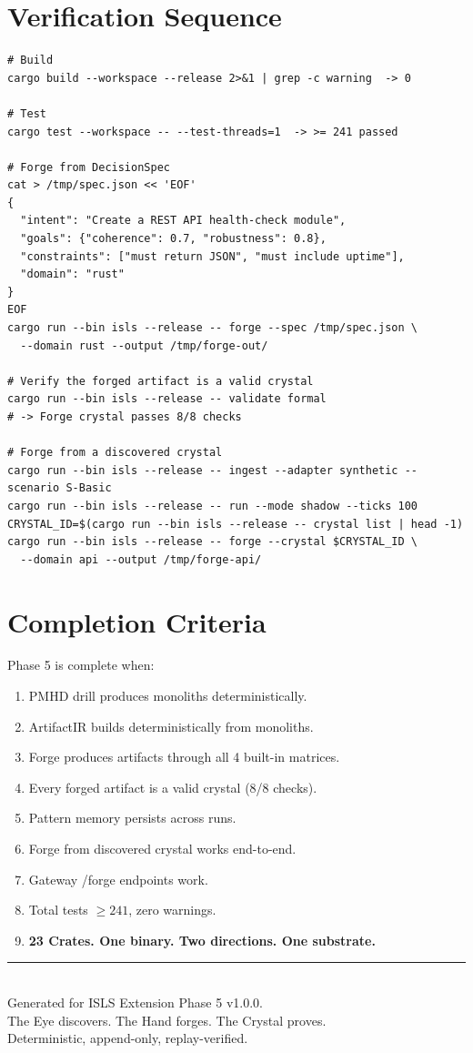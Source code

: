 \documentclass[11pt,a4paper,twoside]{article}
\theoremstyle{definition}
\theoremstyle{plain}
\theoremstyle{remark}
\newcommand{\ISLS}{\textsf{ISLS}}
\begin{document}
\section{Verification Sequence}

\begin{lstlisting}
# Build
cargo build --workspace --release 2>&1 | grep -c warning  -> 0

# Test
cargo test --workspace -- --test-threads=1  -> >= 241 passed

# Forge from DecisionSpec
cat > /tmp/spec.json << 'EOF'
{
  "intent": "Create a REST API health-check module",
  "goals": {"coherence": 0.7, "robustness": 0.8},
  "constraints": ["must return JSON", "must include uptime"],
  "domain": "rust"
}
EOF
cargo run --bin isls --release -- forge --spec /tmp/spec.json \
  --domain rust --output /tmp/forge-out/

# Verify the forged artifact is a valid crystal
cargo run --bin isls --release -- validate formal
# -> Forge crystal passes 8/8 checks

# Forge from a discovered crystal
cargo run --bin isls --release -- ingest --adapter synthetic --scenario S-Basic
cargo run --bin isls --release -- run --mode shadow --ticks 100
CRYSTAL_ID=$(cargo run --bin isls --release -- crystal list | head -1)
cargo run --bin isls --release -- forge --crystal $CRYSTAL_ID \
  --domain api --output /tmp/forge-api/
\end{lstlisting}

\section{Completion Criteria}

Phase 5 is complete when:
\begin{enumerate}[nosep]
  \item PMHD drill produces monoliths deterministically.
  \item ArtifactIR builds deterministically from monoliths.
  \item Forge produces artifacts through all 4 built-in matrices.
  \item Every forged artifact is a valid crystal (8/8 checks).
  \item Pattern memory persists across runs.
  \item Forge from discovered crystal works end-to-end.
  \item Gateway /forge endpoints work.
  \item Total tests $\ge 241$, zero warnings.
  \item \textbf{23 Crates. One binary. Two directions. One substrate.}
\end{enumerate}


\vfill
\begin{center}
\rule{0.5\textwidth}{0.4pt}\\[0.5cm]
{\small Generated for \ISLS{} Extension Phase 5 v1.0.0.\\
The Eye discovers. The Hand forges. The Crystal proves.\\
Deterministic, append-only, replay-verified.}
\end{center}
\end{document}
